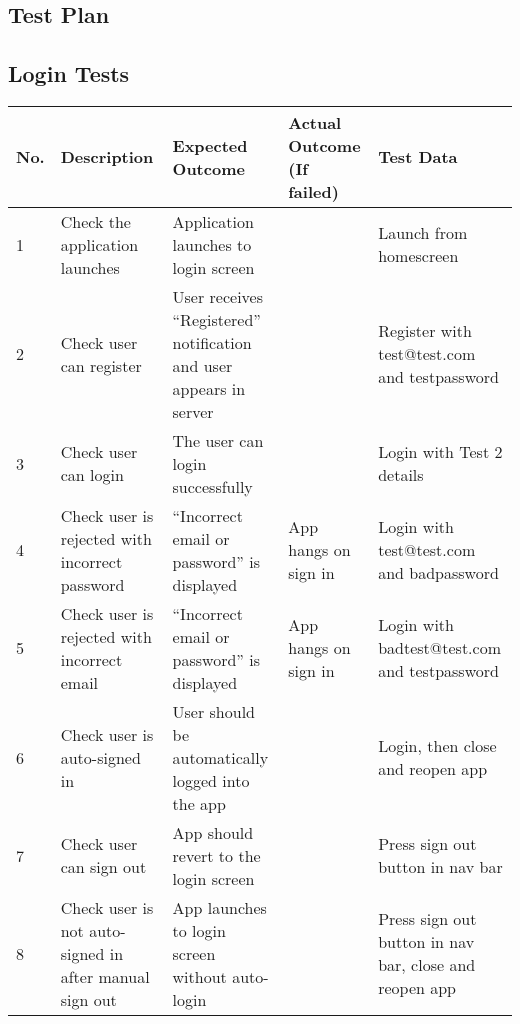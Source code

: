 \begin{landscape}
\chapter{Test Plan}

\section{Login Tests}
\begin{tabularx}{\linewidth}{p{1cm} X X X X}
\textbf{No.} & \textbf{Description}                    & \textbf{Expected Outcome}                                  & \textbf{Actual Outcome (If failed)} & \textbf{Test Data}                                          \\ \hline
1   & Check the application launches                         & Application launches to login screen                          &                            & Launch from homescreen                                 \\ \hline
2   & Check user can register                                & User receives ``Registered'' notification and user appears in server &                            & Register with test@test.com and testpassword           \\ \hline
3   & Check user can login                                  & The user can login successfully                                    &                            & Login with Test 2 details                             \\ \hline
4   & Check user is rejected with incorrect password         & ``Incorrect email or password'' is displayed                         & App hangs on sign in       & Login with test@test.com and badpassword               \\ \hline
5   & Check user is rejected with incorrect email            & ``Incorrect email or password'' is displayed                         & App hangs on sign in       & Login with badtest@test.com and testpassword           \\ \hline
6   & Check user is auto-signed in                           & User should be automatically logged into the app                   &                            & Login, then close and reopen app                       \\ \hline
7   & Check user can sign out                                & App should revert to the login screen                              &                            & Press sign out button in nav bar                       \\ \hline
8   & Check user is not auto-signed in after manual sign out & App launches to login screen without auto-login                    &                            & Press sign out button in nav bar, close and reopen app \\ \hline
\end{tabularx} 


\end{landscape}
